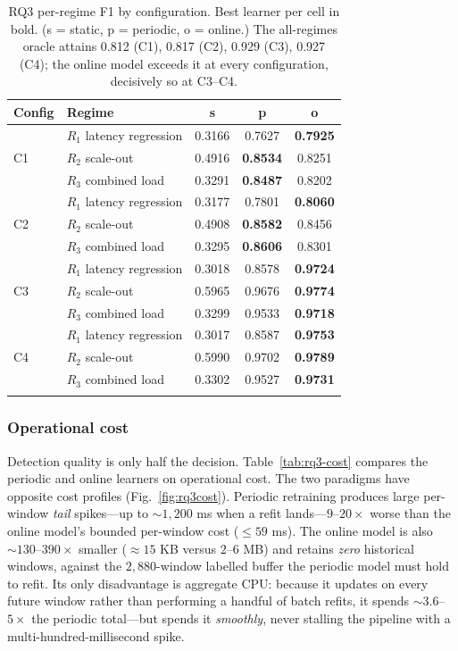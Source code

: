 \documentclass[pdflatex,sn-mathphys-num]{sn-jnl}%
\theoremstyle{thmstyleone}%
\theoremstyle{thmstyletwo}%
\theoremstyle{thmstylethree}%
\begin{document}
\begin{table}[t]
\caption{RQ3 per-regime F1 by configuration. Best learner per cell in bold. (s = static, p = periodic, o = online.) The all-regimes oracle attains 0.812 (C1), 0.817 (C2), 0.929 (C3), 0.927 (C4); the online model exceeds it at every configuration, decisively so at C3--C4.}\label{tab:rq3-regime}
\begin{tabular}{@{}llccc@{}}
\toprule
Config & Regime & s & p & o \\
\midrule
\multirow{3}{*}{C1}
 & $R_1$ latency regression & 0.3166 & 0.7627 & \textbf{0.7925} \\
 & $R_2$ scale-out          & 0.4916 & \textbf{0.8534} & 0.8251 \\
 & $R_3$ combined load      & 0.3291 & \textbf{0.8487} & 0.8202 \\
\midrule
\multirow{3}{*}{C2}
 & $R_1$ latency regression & 0.3177 & 0.7801 & \textbf{0.8060} \\
 & $R_2$ scale-out          & 0.4908 & \textbf{0.8582} & 0.8456 \\
 & $R_3$ combined load      & 0.3295 & \textbf{0.8606} & 0.8301 \\
\midrule
\multirow{3}{*}{C3}
 & $R_1$ latency regression & 0.3018 & 0.8578 & \textbf{0.9724} \\
 & $R_2$ scale-out          & 0.5965 & 0.9676 & \textbf{0.9774} \\
 & $R_3$ combined load      & 0.3299 & 0.9533 & \textbf{0.9718} \\
\midrule
\multirow{3}{*}{C4}
 & $R_1$ latency regression & 0.3017 & 0.8587 & \textbf{0.9753} \\
 & $R_2$ scale-out          & 0.5990 & 0.9702 & \textbf{0.9789} \\
 & $R_3$ combined load      & 0.3302 & 0.9527 & \textbf{0.9731} \\
\botrule
\end{tabular}
\end{table}

\subsubsection{Operational cost}\label{sec:res-rq3-cost}

Detection quality is only half the decision. Table~\ref{tab:rq3-cost} compares the periodic and online learners on operational cost. The two paradigms have opposite cost profiles (Fig.~\ref{fig:rq3cost}). Periodic retraining produces large per-window \emph{tail} spikes---up to $\sim 1{,}200$ ms when a refit lands---$9$--$20\times$ worse than the online model's bounded per-window cost ($\leq 59$ ms). The online model is also $\sim 130$--$390\times$ smaller ($\approx 15$ KB versus $2$--$6$ MB) and retains \emph{zero} historical windows, against the $2{,}880$-window labelled buffer the periodic model must hold to refit. Its only disadvantage is aggregate CPU: because it updates on every future window rather than performing a handful of batch refits, it spends $\sim 3.6$--$5\times$ the periodic total---but spends it \emph{smoothly}, never stalling the pipeline with a multi-hundred-millisecond spike.
\end{document}
